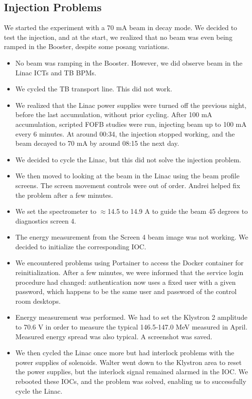 \documentclass{article}
\begin{document}
\subsection{Injection Problems}
We started the experiment with a 70 mA beam in decay mode. We decided to test the injection, and at the start, we realized that no beam was even being ramped in the Booster, despite some posang variations.
\begin{itemize}
\item No beam was ramping in the Booster. However, we did observe beam in the Linac ICTs and TB BPMs.
\item We cycled the TB transport line. This did not work.
\item We realized that the Linac power supplies were turned off the previous night, before the last accumulation, without prior cycling. After 100 mA accumulation, scripted FOFB studies were run, injecting beam up to 100 mA every 6 minutes. At around 00:34, the injection stopped working, and the beam decayed to 70 mA by around 08:15 the next day.
\item We decided to cycle the Linac, but this did not solve the injection problem.
\item We then moved to looking at the beam in the Linac using the beam profile screens. The screen movement controls were out of order. Andrei helped fix the problem after a few minutes.
\item We set the spectrometer to $\approx$14.5 to 14.9 A to guide the beam 45 degrees to diagnostics screen 4.
\item The energy measurement from the Screen 4 beam image was not working. We decided to initialize the corresponding IOC.
\item We encountered problems using Portainer to access the Docker container for reinitialization. After a few minutes, we were informed that the service login procedure had changed: authentication now uses a fixed user with a given password, which happens to be the same user and password of the control room desktops.
\item Energy measurement was performed. We had to set the Klystron 2 amplitude to 70.6 V in order to measure the typical 146.5-147.0 MeV measured in April. Measured energy spread was also typical. A screenshot was saved.
\item We then cycled the Linac once more but had interlock problems with the power supplies of solenoids. Walter went down to the Klystron area to reset the power supplies, but the interlock signal remained alarmed in the IOC. We rebooted these IOCs, and the problem was solved, enabling us to successfully cycle the Linac.

\end{itemize}
\end{document}
